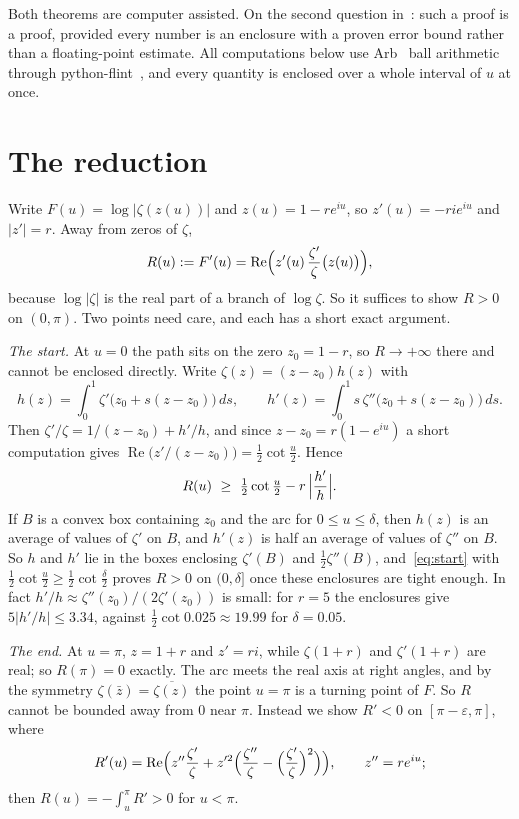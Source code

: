 \documentclass[11pt]{amsart}
\theoremstyle{remark}
\begin{document}
Both theorems are computer assisted. On the second question in~\cite{MSE}: such a proof is a proof, provided every number is an enclosure with a proven error bound rather than a floating-point estimate. All computations below use Arb~\cite{Arb} ball arithmetic through python-flint~\cite{flint}, and every quantity is enclosed over a whole interval of $u$ at once.

\section{The reduction}

Write $F(u)=\log|\zeta(z(u))|$ and $z(u)=1-re^{iu}$, so $z'(u)=-rie^{iu}$ and $|z'|=r$. Away from zeros of $\zeta$,
\[
R(u):=F'(u)=\operatorname{Re}\Bigl(z'(u)\,\frac{\zeta'}{\zeta}\bigl(z(u)\bigr)\Bigr),
\]
because $\log|\zeta|$ is the real part of a branch of $\log\zeta$. So it suffices to show $R>0$ on $(0,\pi)$. Two points need care, and each has a short exact argument.

\emph{The start.} At $u=0$ the path sits on the zero $z_0=1-r$, so $R\to+\infty$ there and cannot be enclosed directly. Write $\zeta(z)=(z-z_0)h(z)$ with
\[
h(z)=\int_0^1\zeta'\bigl(z_0+s(z-z_0)\bigr)\,ds,\qquad h'(z)=\int_0^1 s\,\zeta''\bigl(z_0+s(z-z_0)\bigr)\,ds .
\]
Then $\zeta'/\zeta=1/(z-z_0)+h'/h$, and since $z-z_0=r(1-e^{iu})$ a short computation gives $\operatorname{Re}\bigl(z'/(z-z_0)\bigr)=\frac12\cot\frac u2$. Hence
\begin{equation}\label{eq:start}
R(u)\ \ge\ \tfrac12\cot\tfrac u2-r\,\Bigl|\frac{h'}{h}\Bigr| .
\end{equation}
If $B$ is a convex box containing $z_0$ and the arc for $0\le u\le\delta$, then $h(z)$ is an average of values of $\zeta'$ on $B$, and $h'(z)$ is half an average of values of $\zeta''$ on $B$. So $h$ and $h'$ lie in the boxes enclosing $\zeta'(B)$ and $\frac12\zeta''(B)$, and~\eqref{eq:start} with $\frac12\cot\frac u2\ge\frac12\cot\frac\delta2$ proves $R>0$ on $(0,\delta]$ once these enclosures are tight enough. In fact $h'/h\approx\zeta''(z_0)/(2\zeta'(z_0))$ is small: for $r=5$ the enclosures give $5|h'/h|\le3.34$, against $\frac12\cot0.025\approx19.99$ for $\delta=0.05$.

\emph{The end.} At $u=\pi$, $z=1+r$ and $z'=ri$, while $\zeta(1+r)$ and $\zeta'(1+r)$ are real; so $R(\pi)=0$ exactly. The arc meets the real axis at right angles, and by the symmetry $\zeta(\bar z)=\overline{\zeta(z)}$ the point $u=\pi$ is a turning point of $F$. So $R$ cannot be bounded away from $0$ near $\pi$. Instead we show $R'<0$ on $[\pi-\varepsilon,\pi]$, where
\[
R'(u)=\operatorname{Re}\Bigl(z''\frac{\zeta'}{\zeta}+z'^2\Bigl(\frac{\zeta''}{\zeta}-\Bigl(\frac{\zeta'}{\zeta}\Bigr)^{2}\Bigr)\Bigr),\qquad z''=re^{iu};
\]
then $R(u)=-\int_u^\pi R'>0$ for $u<\pi$.
\end{document}
